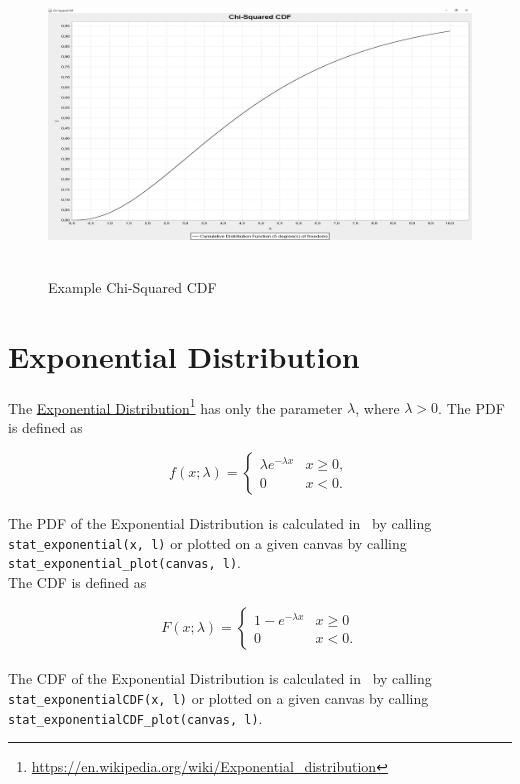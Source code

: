 		\begin{figure}[H]
			\centering
			\includegraphics[width=1\textwidth]{Figures/implemented_functions/chi_squared_cdf}~\\
			\caption{Example Chi-Squared CDF}
			\label{fig:chi_squared_cdf}
		\end{figure}


	\section{Exponential Distribution}

		The \href{https://en.wikipedia.org/wiki/Exponential_distribution}{Exponential Distribution}\footnote{\url{https://en.wikipedia.org/wiki/Exponential_distribution}} has only the parameter $\lambda$, where $\lambda > 0$. The \ac{PDF} is defined as

		$$f(x;\lambda) = \begin{cases} \lambda e^{-\lambda x} & x \ge 0, \\ 0 & x < 0. \end{cases}$$
		\\[0.3cm]
		The \ac{PDF} of the Exponential Distribution is calculated in \setlx\ by calling \lstinline{stat_exponential(x, l)} or plotted on a given canvas by calling \lstinline{stat_exponential_plot(canvas, l)}.
		\\[0.3cm]
		The \ac{CDF} is defined as

		$$F(x;\lambda) = \begin{cases} 1-e^{-\lambda x} & x \ge 0 \\ 0 & x < 0. \end{cases}$$
		\\[0.3cm]
		The \ac{CDF} of the Exponential Distribution is calculated in \setlx\ by calling \lstinline{stat_exponentialCDF(x, l)} or plotted on a given canvas by calling \lstinline{stat_exponentialCDF_plot(canvas, l)}.

